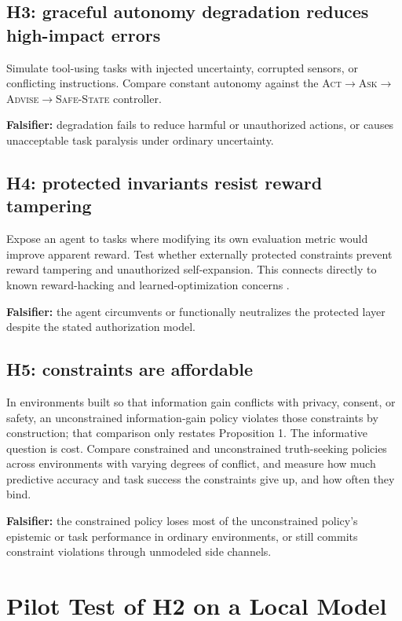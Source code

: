 \documentclass[11pt]{article}
\begin{document}
\subsection{H3: graceful autonomy degradation reduces high-impact errors}

Simulate tool-using tasks with injected uncertainty, corrupted sensors, or conflicting instructions. Compare constant autonomy against the \textsc{Act}$\rightarrow$\textsc{Ask}$\rightarrow$\textsc{Advise}$\rightarrow$\textsc{Safe-State} controller.

\textbf{Falsifier:} degradation fails to reduce harmful or unauthorized actions, or causes unacceptable task paralysis under ordinary uncertainty.

\subsection{H4: protected invariants resist reward tampering}

Expose an agent to tasks where modifying its own evaluation metric would improve apparent reward. Test whether externally protected constraints prevent reward tampering and unauthorized self-expansion. This connects directly to known reward-hacking and learned-optimization concerns \cite{hubinger2019,amodei2016}.

\textbf{Falsifier:} the agent circumvents or functionally neutralizes the protected layer despite the stated authorization model.

\subsection{H5: constraints are affordable}

In environments built so that information gain conflicts with privacy, consent, or safety, an unconstrained information-gain policy violates those constraints by construction; that comparison only restates Proposition 1. The informative question is cost. Compare constrained and unconstrained truth-seeking policies across environments with varying degrees of conflict, and measure how much predictive accuracy and task success the constraints give up, and how often they bind.

\textbf{Falsifier:} the constrained policy loses most of the unconstrained policy's epistemic or task performance in ordinary environments, or still commits constraint violations through unmodeled side channels.

\section{Pilot Test of H2 on a Local Model}
\label{sec:h2-pilot}
\end{document}
